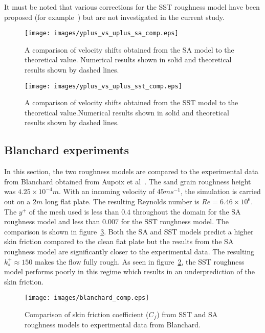 It must be noted that various corrections for the SST roughness model have been proposed (for example~\cite{knopp2009new,aupoix2015sstroughness}) but are not investigated in the current study.
\begin{figure}[h!]
    \centering
    \texttt{[image: images/yplus\_vs\_uplus\_sa\_comp.eps]} 
    \caption{A comparison of velocity shifts obtained from the SA model to the theoretical value. Numerical results shown in solid and theoretical results shown by dashed lines. }
    \label{fig:compsa}
\end{figure}
\begin{figure}[h!]
    \centering
    \texttt{[image: images/yplus\_vs\_uplus\_sst\_comp.eps]} 
    \caption{A comparison of velocity shifts obtained from the SST model to the theoretical value.Numerical results shown in solid and theoretical results shown by dashed lines.}
    \label{fig:compsst}
\end{figure}

\subsection{Blanchard experiments}
In this section, the two roughness models are compared to the experimental data from Blanchard obtained from Aupoix et al~\cite{SAroughorig}. The sand grain roughness height was $4.25\times10^{-4}m$. With an incoming velocity of $45ms^{-1}$, the simulation is carried out on a $2m$ long flat plate. The resulting Reynolds number is $Re=6.46\times10^6$. The $y^+$ of the mesh used is less than $0.4$ throughout the domain for the SA roughness model and less than $0.007$ for the SST roughness model. The comparison is shown in figure~\ref{fig:blan}. Both the SA and SST models predict a higher skin friction compared to the clean flat plate but the results from the SA roughness model are significantly closer to the experimental data. The resulting $k_s^+ \approx 150$ makes the flow fully rough. As seen in figure~\ref{fig:compsst}, the SST roughness model performs poorly in this regime which results in an underprediction of the skin friction.%
\begin{figure}[h!]
    \centering
    \texttt{[image: images/blanchard\_comp.eps]}
    \caption{Comparison of skin friction coefficient ($C_f$) from SST and SA roughness models to experimental data from Blanchard\cite{SAroughorig}.}
    \label{fig:blan}
\end{figure}


